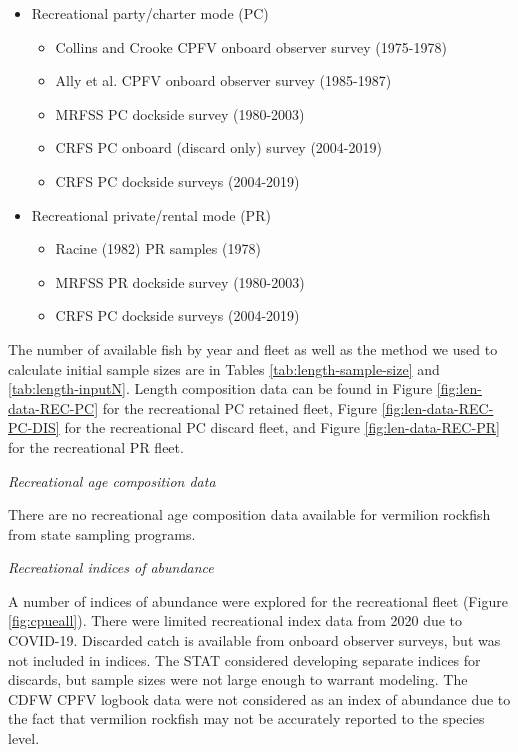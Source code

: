 \documentclass[
  english,
  a4paper,
]{article}
\begin{document}
\begin{itemize}
 \item Recreational party/charter mode (PC)
   \begin{itemize}
    \item Collins and Crooke CPFV onboard observer survey (1975-1978)  
    \item Ally  et al. CPFV onboard observer survey (1985-1987)
    \item MRFSS PC dockside survey (1980-2003)     
    \item CRFS PC onboard (discard only) survey (2004-2019)
    \item CRFS PC dockside surveys (2004-2019)
  \end{itemize}
 \item Recreational private/rental mode (PR)
   \begin{itemize}
    \item Racine (1982) PR samples (1978)
    \item MRFSS PR dockside survey (1980-2003) 
    \item CRFS PC dockside surveys (2004-2019)
   \end{itemize}
\end{itemize}

The number of available fish by year and fleet as well as the method we used to
calculate initial sample sizes are in Tables \ref{tab:length-sample-size} and \ref{tab:length-inputN}.
Length composition data can be found in Figure
\ref{fig:len-data-REC-PC} for the recreational PC retained fleet, Figure \ref{fig:len-data-REC-PC-DIS} for
the recreational PC discard fleet, and Figure \ref{fig:len-data-REC-PR} for the recreational PR fleet.

\emph{Recreational age composition data}

There are no recreational age composition data available for vermilion rockfish from state sampling programs.

\emph{Recreational indices of abundance}

A number of indices of abundance were explored for the recreational fleet (Figure \ref{fig:cpueall}). There were limited recreational index data from 2020 due to COVID-19. Discarded catch is available from onboard observer surveys, but was not included in indices. The STAT considered developing separate indices for discards, but sample sizes were not large enough to warrant modeling. The CDFW CPFV logbook data were not considered as an index of abundance due to the fact that
vermilion rockfish may not be accurately reported to the species level.
\end{document}
